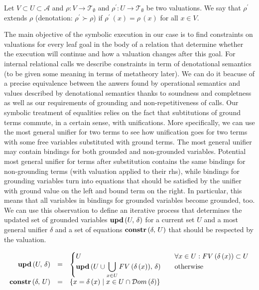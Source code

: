 \begin{definition}
  Let $ V \subset U \subset \mathcal{A} $ and $ \rho \colon V \to \mathcal{T}_{\emptyset} $ and $ \rho^\prime \colon U \to \mathcal{T}_{\emptyset} $ be two valuations. We say that $\rho^\prime$ extends $\rho$ (denotation: $ \rho^\prime \succ \rho$) if $\rho^\prime\,(x) = \rho\,(x)$ for all $x \in V$.
\end{definition}

The main objective of the symbolic execution in our case is to find constraints on valuations for every leaf goal in the body of a relation that determine
whether the execution will continue and how a valuation changes after this goal. For internal relational calls we describe constraints in term of denotational
semantics (to be given some meaning in terms of metatheory later). We can do it beacuse of a precise equivalence between the anwers found by operational semantics
and values described by denotational semantics thanks to soundness and completness as well as our requirements of grounding and non-repetitiveness of calls.
Our symbolic treatment of equalities relies on the fact that subtitutions of ground terms commute, in a certain sense, with unifications. More specifically,
we can use the most general unifier for two terms to see how unification goes for two terms with some free variables substituted with ground terms.
The most general unifier may contain bindings for both grounded and non-grounded variables. Potential most general unifier for terms after substitution
contains the same bindings for non-grounding terms (with valuation applied to their rhs), while bindings for grounding variables turn into equations that
should be satisfied by the unifier with ground value on the left and bound term on the right. In particular, this means that all variables in bindings for
grounded variables become grounded, too. We can use this observation to define an iterative process that determines the updated set of grounded
variables $\mbox{\textbf{upd}}\,(U,\, \delta)$ for a current set $U$ and a most general unifier $\delta$ and a set of equations $\mbox{\textbf{constr}}\,(\delta,\, U)$ that should be
respected by the valuation.

\[
\begin{array}{rcl}
\mbox{\textbf{upd}}\,(U,\, \delta) &=& \begin{cases}
                           U & \quad\forall x \in U : FV\,(\delta\,(x)) \subset U \\
                           \mbox{\textbf{upd}}\,(U \cup \displaystyle\bigcup\limits_{x \in U} FV\,(\delta\,(x)),\, \delta) & \quad\mbox{otherwise}
                          \end{cases}\\
\mbox{\textbf{constr}}\,(\delta,\, U) &=& \{ x = \delta\,(x) \mid x \in U \cap \mathcal{D}om\,(\delta) \}
\end{array}
\]

